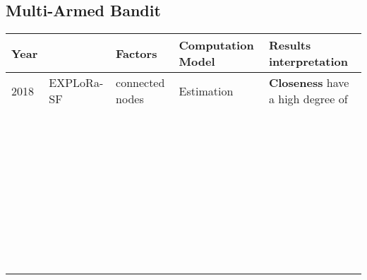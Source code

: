 \subsection{Multi-Armed Bandit}
\begin{longtable}{lllll}
	Year  & \                                              & \textbf{Factors}              & \textbf{Computation Model}             & \textbf{Results interpretation}                               \\\hline
	2018  & EXPLoRa-SF \cite{cuomo_explora_2017}           & connected nodes               & Estimation                             & \textbf{Closeness} have a high degree of                      \\
	\     &                                                &                               &                                        &                                                               \\
	\     &                                                &                               &                                        &                                                               \\
	\     &                                                &                               &                                        &                                                               \\
	\     &                                                &                               &                                        &                                                               \\
	\     &                                                &                               &                                        &                                                               \\
	\     &                                                &                               &                                        &                                                               \\
	\     &                                                &                               &                                        &                                                               \\
	\     &                                                &                               &                                        &                                                               \\

\end{longtable}
